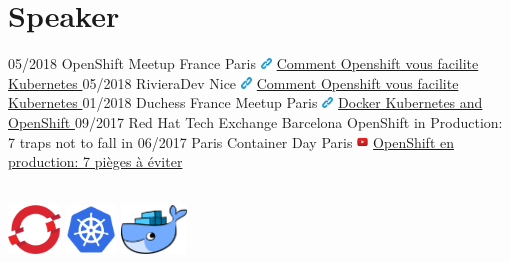 \documentclass[]{friggeri-cv}
\begin{document}
\section{Speaker}  
\setlength{\parsepsave}{\parsep}%
\setlength{\parsep}{3pt}%
	\begin{entrylist}	
		\entry
		{05/2018}
		{OpenShift Meetup France}
		{Paris}
		{ {\includegraphics[width=0.3cm]{img/link.png}} \href{https://www.meetup.com/fr-FR/OpenShift-France/events/250776251/} { Comment Openshift vous facilite Kubernetes }}
		\entry
		{05/2018}
		{RivieraDev}
		{Nice}
		{ {\includegraphics[width=0.3cm]{img/link.png}} \href{https://2018.rivieradev.fr/session/370}
		{Comment Openshift vous facilite Kubernetes }}		
		\entry
		{01/2018 }
		{Duchess France Meetup}
		{Paris}
	 	{ {\includegraphics[width=0.3cm]{img/link.png}}
		 	\href{https://www.duchess-france.org/soiree-docker-kubernetes-openshift-eloise-faure/} { Docker Kubernetes and OpenShift }}
		\entry
		{09/2017}
		{Red Hat Tech Exchange}
		{Barcelona}
		{OpenShift in Production: 7 traps not to fall in}	
		\entry
		{06/2017}
		{Paris Container Day}
		{Paris}
		 {  {\includegraphics[width=0.3cm]{img/youtube.png}} \href{https://www.youtube.com/watch?v=zK2oqZhhPSI} { OpenShift en production: 7 pièges à éviter } }		
	\end{entrylist}
\setlength{\parsep}{\parsepsave}%
\\

\qquad \qquad  \includegraphics[height=13mm]{logo/openshift-logo.png}    \qquad \qquad  \includegraphics[height=13mm]{logo/kubernetes-logo.png}  \qquad \qquad 	\includegraphics[height=13mm]{logo/docker-logo.png}  \qquad \qquad 
\vspace{2mm}
\end{document}
